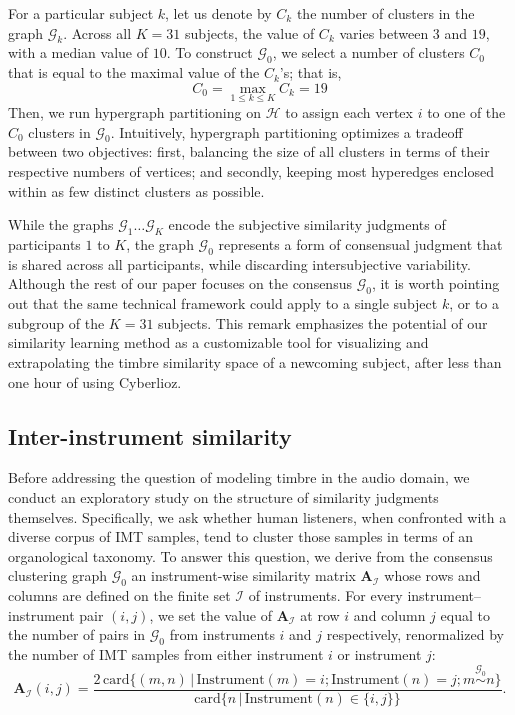 \documentclass{bmcart}
\newcommand{\Card}{\mathrm{card}}
\begin{document}
For a particular subject $k$, let us denote by $C_k$ the number of clusters in the graph $\mathcal{G}_k$.
Across all $K=31$ subjects, the value of $C_k$ varies between $3$ and $19$, with a median value of $10$.
To construct $\mathcal{G}_0$, we select a number of clusters $C_0$ that is equal to the maximal value of the $C_k$'s; that is,
\begin{equation}
C_0 = \max_{1\leq k \leq K} C_k = 19
\end{equation}
Then, we run hypergraph partitioning on $\mathcal{H}$ to assign each vertex $i$ to one of the $C_0$ clusters in $\mathcal{G}_0$.
Intuitively, hypergraph partitioning optimizes a tradeoff between two objectives: first, balancing the size of all clusters in terms of their respective numbers of vertices; and secondly, keeping most hyperedges enclosed within as few distinct clusters as possible.

While the graphs $\mathcal{G}_1 \ldots \mathcal{G}_K$ encode the subjective similarity judgments of participants $1$ to $K$, the graph $\mathcal{G}_0$ represents a form of consensual judgment that is shared across all participants, while discarding intersubjective variability.
Although the rest of our paper focuses on the consensus $\mathcal{G}_0$, it is worth pointing out that the same technical framework could apply to a single subject $k$, or to a subgroup of the $K=31$ subjects.
This remark emphasizes the potential of our similarity learning method as a customizable tool for visualizing and extrapolating the timbre similarity space of a newcoming subject, after less than one hour of using Cyberlioz.


\subsection*{Inter-instrument similarity}

Before addressing the question of modeling timbre in the audio domain, we conduct an exploratory study on the structure of similarity judgments themselves.
Specifically, we ask whether human listeners, when confronted with a diverse corpus of IMT samples, tend to cluster those samples in terms of an organological taxonomy.
To answer this question, we derive from the consensus clustering graph $\mathcal{G}_0$ an instrument-wise similarity matrix $\mathbf{A}_{\mathcal{I}}$ whose rows and columns are defined on the finite set $\mathcal{I}$ of instruments.
For every instrument--instrument pair $(i,j)$, we set the value of $\mathbf{A}_{\mathcal{I}}$ at row $i$ and column $j$ equal to the number of pairs in $\mathcal{G}_0$ from instruments $i$ and $j$ respectively, renormalized by the number of IMT samples from either instrument $i$ or instrument $j$:
\[
\mathbf{A}_{\mathcal{I}}(i,j) = \dfrac{
2\,\Card \big\{ (m, n) \,\vert\, \mathrm{Instrument}(m)=i ; \mathrm{Instrument}(n)=j ; m \overset{\mathcal{G}_0}{\sim} n \big\}
}{
\Card \big\{n \,\vert\, \mathrm{Instrument}(n) \in \{ i, j \} \big\}
}.
\label{eq:instrument-similarity}
\]
\end{document}
